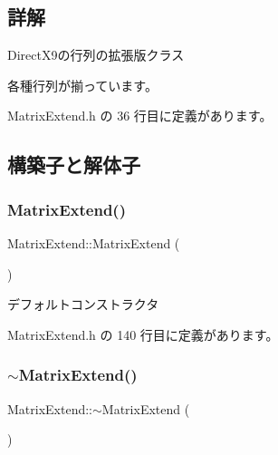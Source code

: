 \subsection{詳解}
Direct\+X9の行列の拡張版クラス 

各種行列が揃っています。 

 Matrix\+Extend.\+h の 36 行目に定義があります。



\subsection{構築子と解体子}
\mbox{\label{class_matrix_extend_a0058bf9dcf42d7f0c53b6fb3559b6a6e}} 
\subsubsection{\texorpdfstring{Matrix\+Extend()}{MatrixExtend()}}
{\footnotesize\ttfamily Matrix\+Extend\+::\+Matrix\+Extend (\begin{DoxyParamCaption}{ }\end{DoxyParamCaption})\hspace{0.3cm}{\ttfamily [inline]}}



デフォルトコンストラクタ 


\begin{DoxyItemize}
\item 
\end{DoxyItemize}

 Matrix\+Extend.\+h の 140 行目に定義があります。

\mbox{\label{class_matrix_extend_ae1d80dfa20420bdc58e85eccc525fe91}} 
\subsubsection{\texorpdfstring{$\sim$\+Matrix\+Extend()}{~MatrixExtend()}}
{\footnotesize\ttfamily Matrix\+Extend\+::$\sim$\+Matrix\+Extend (\begin{DoxyParamCaption}{ }\end{DoxyParamCaption})\hspace{0.3cm}{\ttfamily [inline]}}

